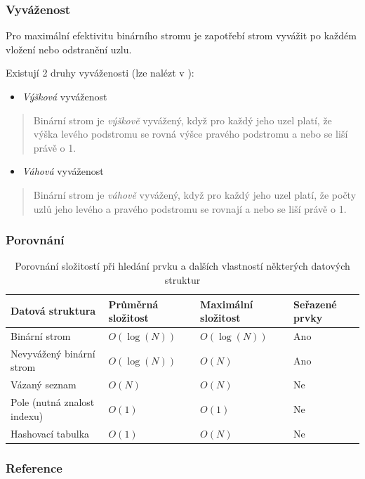 \documentclass[10pt,xcolor=pdflatex,hyperref={unicode}]{beamer}
\begin{document}
\begin{frame}\frametitle{Vyváženost}

    Pro maximální efektivitu binárního stromu je zapotřebí strom vyvážit po každém vložení nebo odstranění uzlu.
    
    Existují 2 druhy vyváženosti (lze nalézt v \cite{HonzíkJanMaxmilián1991Vkzp}):
    \begin{itemize}
        \item \emph{Výšková} vyváženost
    \end{itemize}
    \begin{quote}
        Binární strom je \emph{výškově} vyvážený, když pro každý jeho uzel platí, že výška levého podstromu se rovná výšce pravého podstromu a nebo se liší právě o 1.
    \end{quote}
    
    \begin{itemize}
        \item \emph{Váhová} vyváženost
    \end{itemize}
    \begin{quote}
        Binární strom je \emph{váhově} vyvážený, když pro každý jeho uzel platí, že počty uzlů jeho levého a pravého podstromu se rovnají a nebo se liší právě o 1.
    \end{quote}
    
\end{frame}

\begin{frame}\frametitle{Porovnání}

    \renewcommand{\arraystretch}{2}
    \begin{table}[ht]
        \centering
        \begin{tabular}{|p{3.35cm}|p{1.8cm}|p{1.9cm}|p{1.7cm}|}
            \hline
            \textbf{Datová struktura} & \textbf{Průměrná složitost} & \textbf{Maximální složitost} & \textbf{Seřazené prvky} \\
            \hline
            Binární strom & $O(\log(N))$ & $O(\log(N))$ & Ano \\
            \hline
            Nevyvážený binární strom & $O(\log(N))$ & $O(N)$ & Ano \\
            \hline
            Vázaný seznam & $O(N)$ & $O(N)$ & Ne \\
            \hline
            Pole (nutná znalost indexu) & $O(1)$ & $O(1)$ & Ne \\
            \hline
            Hashovací tabulka & $O(1)$ & $O(N)$ & Ne \\
            \hline
        \end{tabular}
        \caption{Porovnání složitostí při hledání prvku a dalších vlastností některých datových struktur}
        \label{tabComparison}
    \end{table}
    
\end{frame}

\begin{frame}\frametitle{Reference}

    
    
    
\end{frame}

\end{document}
